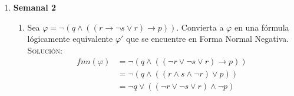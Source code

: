 \documentclass[letterpaper,12pt]{article}
\begin{document}
\begin{enumerate}
\begin{enumerate}
\begin{proof}
\begin{itemize}
\begin{enumerate}
\begin{itemize}
                        \item[iii)] $\varphi = \phi \star \psi$ con 
                        $\star \in \{ \leftrightarrow\}$. Entonces 
                        \begin{align*}
                            nn(\varphi) 
                            &= nn(\phi \leftrightarrow \psi)
                            && \text{def. de $\varphi$} \\
                            &= nn(\phi) + nn(\psi) + 0
                            && \text{def. recursiva de nn} \\
                            &\leq nn(qi(\phi)) + nn(qi(\psi)) + 0
                            && \text{H.I.} \\
                            &\leq nn(qi(\phi) \leftrightarrow qi(\psi))
                            && \text{def. recursiva de nn} \\
                            &\leq nn((\neg qi(\phi) \lor qi(\psi)) \land 
                            (qi(\phi) \lor \neg qi(\psi)))
                            && \text{equivalencia lógica} \\
                            &\leq nn(qi(\phi \leftrightarrow \psi))
                            && \text{def. recursiva de qi} \\
                            &\leq nn(qi(\varphi))
                            && \text{def. de $\varphi$}
                        \end{align*}

                    \end{itemize}
                \end{enumerate}
            \end{itemize}
        \end{proof}

    \end{enumerate}

    \newpage
    \item \textbf{Semanal 2}
    \begin{enumerate}
        \item Sea 
        $\varphi = \neg(q \land ((r \rightarrow \neg s \lor r) \rightarrow p))$.
        Convierta a $\varphi$ en una fórmula lógicamente equivalente $\varphi '$
        que se encuentre en Forma Normal Negativa. \\
        \textsc{Solución:}
        \begin{align*}
            fnn(\varphi) 
            &= \neg(q \land ((\neg r \lor \neg s \lor r) \rightarrow p)) \\
            &= \neg(q \land ((r \land s \land \neg r) \lor p)) \\
            &= \neg q \lor ((\neg r \lor \neg s \lor r) \land \neg p)
        \end{align*}


\end{enumerate}
\end{enumerate}
\end{document}
